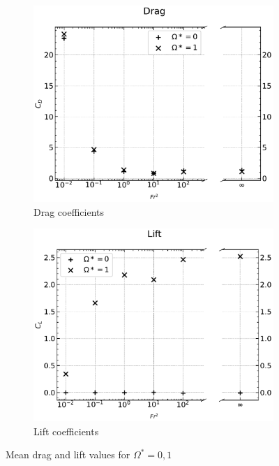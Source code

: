 \begin{figure}
    \centering
    \begin{subfigure}[b]{0.49\textwidth}
        \centering
        \includegraphics[width=\textwidth]{images/circle/circledrag.pdf}
        \caption{Drag coefficients}
        \label{fig:circledrag}
    \end{subfigure}
    \hfill
    \begin{subfigure}[b]{0.49\textwidth}
        \centering
        \includegraphics[width=\textwidth]{images/circle/circlelift.pdf}
        \caption{Lift coefficients}
        \label{fig:circlelift}
    \end{subfigure}
    \caption{Mean drag and lift values for $\Omega^{\ast} = {0,1}$}
    \label{fig:circleforces}
\end{figure} 
